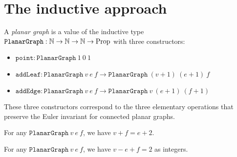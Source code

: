 \maketitle

\begin{abstract}
This blueprint documents the formalization of Euler's polyhedron formula
$V - E + F = 2$ for connected planar graphs in Lean 4 + Mathlib.
The project uses the \texttt{CombinatorialMap} structure proposed in
mathlib4 PR \#16074 alongside an inductive \texttt{PlanarGraph} type.
All results are fully verified with no \texttt{sorry}.
\end{abstract}

\section{The inductive approach}

\begin{definition}[PlanarGraph]\label{def:planar_graph}
\leanok
A \emph{planar graph} is a value of the inductive type
$\texttt{PlanarGraph} : \mathbb{N} \to \mathbb{N} \to \mathbb{N} \to \text{Prop}$
with three constructors:
\begin{itemize}
  \item $\texttt{point} : \texttt{PlanarGraph}\ 1\ 0\ 1$
  \item $\texttt{addLeaf} : \texttt{PlanarGraph}\ v\ e\ f \to \texttt{PlanarGraph}\ (v{+}1)\ (e{+}1)\ f$
  \item $\texttt{addEdge} : \texttt{PlanarGraph}\ v\ e\ f \to \texttt{PlanarGraph}\ v\ (e{+}1)\ (f{+}1)$
\end{itemize}
These three constructors correspond to the three elementary operations that
preserve the Euler invariant for connected planar graphs.
\end{definition}

\begin{theorem}\label{thm:euler_formula}
\leanok
{}
For any $\texttt{PlanarGraph}\ v\ e\ f$, we have $v + f = e + 2$.
\end{theorem}

\begin{corollary}\label{thm:euler_int}
\leanok
{}
For any $\texttt{PlanarGraph}\ v\ e\ f$, we have $v - e + f = 2$ as integers.
\end{corollary}

